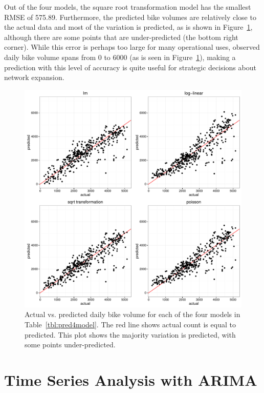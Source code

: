 \documentclass [11pt, proquest] {uwthesis}[2015/03/03]
\begin{document}

Out of the four models, the square root transformation model has the smallest RMSE of 575.89. Furthermore, the predicted bike volumes are relatively close to the actual data and most of the variation is predicted, as is shown in Figure~\ref{fig:avpmodel0}, although there are some points that are under-predicted (the bottom right corner). While this error is perhaps too large for many operational uses, observed daily bike volume spans from 0 to 6000 (as is seen in Figure~\ref{fig:avpmodel0}), making a prediction with this level of accuracy is quite useful for strategic decisions about network expansion.
\begin{figure}
\centering
   \includegraphics[width=1\textwidth]{figures/prediction/actualvspred} \caption{Actual vs. predicted daily bike volume for each of the four models in Table~\ref{tbl:pred4model}. The red line shows actual count is equal to predicted. This plot shows the majority variation is predicted, with some points under-predicted.}
  \label{fig:avpmodel0}
  \vspace{-.5in}
\end{figure}

\section{Time Series Analysis with ARIMA}
\end{document}
